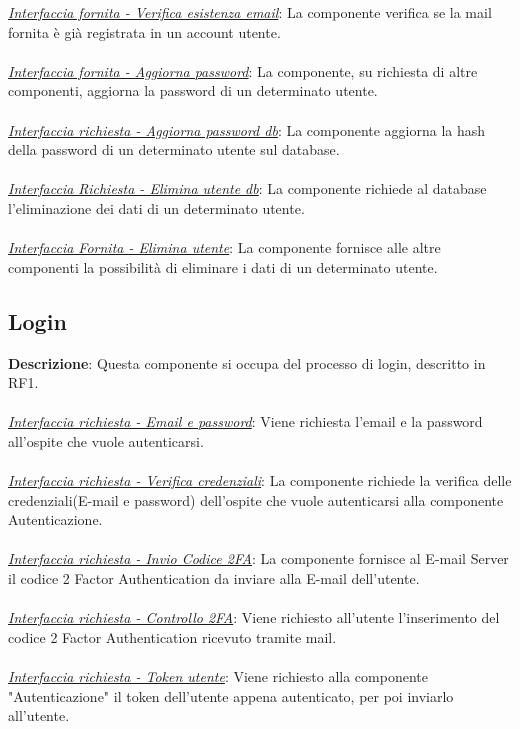 \documentclass{report}
\begin{document}
\uline{\textit{Interfaccia fornita - Verifica esistenza email}}: 
La componente verifica se la mail fornita è già registrata in un account utente.\\\\
\uline{\textit{Interfaccia fornita - Aggiorna password}}:
La componente, su richiesta di altre componenti, aggiorna la password di un determinato utente.\\\\
\uline{\textit{Interfaccia richiesta - Aggiorna password db}}: 
La componente aggiorna la hash della password di un determinato utente sul database.  \\\\
\uline{\textit{Interfaccia Richiesta - Elimina utente db}}: 
La componente richiede al database l'eliminazione dei dati di un determinato utente.\\\\
\uline{\textit{Interfaccia Fornita - Elimina utente}}: 
La componente fornisce alle altre componenti la possibilità di eliminare i dati di un determinato utente.
\subsection*{Login}
\textbf{Descrizione}: Questa componente si occupa del processo di login, descritto in RF1.\\ \\ 
\uline{\textit{Interfaccia richiesta - Email e password}}: 
Viene richiesta l'email e la password all'ospite che vuole autenticarsi.\\ \\ 
\uline{\textit{Interfaccia richiesta - Verifica credenziali}}: 
La componente richiede la verifica delle credenziali(E-mail e password) dell'ospite che vuole autenticarsi alla componente Autenticazione.\\ \\ 
\uline{\textit{Interfaccia richiesta - Invio Codice 2FA}}: 
La componente fornisce al E-mail Server il codice 2 Factor Authentication da inviare alla E-mail dell'utente.\\ \\
\uline{\textit{Interfaccia richiesta - Controllo 2FA}}: 
Viene richiesto all'utente l'inserimento del codice 2 Factor Authentication ricevuto tramite mail.\\ \\ 
\uline{\textit{Interfaccia richiesta - Token utente}}: 
Viene richiesto alla componente "Autenticazione" il token dell'utente appena autenticato, per poi inviarlo all'utente.
\end{document}
